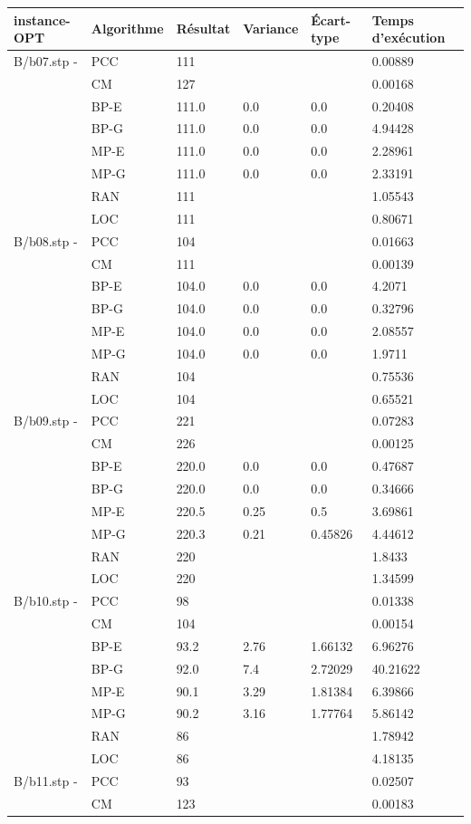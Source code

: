\documentclass[12pt,a4paper]{article}
\begin{document}
\begin{center}
	\begin{tabular}{l|l|l|l|l|l}
		instance-OPT & Algorithme & Résultat & Variance & Écart-type & Temps d'exécution\\ \hline \hline
		B/b07.stp - &PCC&111&&&0.00889\\
		&CM&127&&&0.00168\\
		&BP-E&111.0&0.0&0.0&0.20408\\
		&BP-G&111.0&0.0&0.0&4.94428\\
		&MP-E&111.0&0.0&0.0&2.28961\\
		&MP-G&111.0&0.0&0.0&2.33191\\
		&RAN&111&&&1.05543\\
		&LOC&111&&&0.80671\\\hline
		B/b08.stp - &PCC&104&&&0.01663\\
		&CM&111&&&0.00139\\
		&BP-E&104.0&0.0&0.0&4.2071\\
		&BP-G&104.0&0.0&0.0&0.32796\\
		&MP-E&104.0&0.0&0.0&2.08557\\
		&MP-G&104.0&0.0&0.0&1.9711\\
		&RAN&104&&&0.75536\\
		&LOC&104&&&0.65521\\\hline
		B/b09.stp - &PCC&221&&&0.07283\\
		&CM&226&&&0.00125\\
		&BP-E&220.0&0.0&0.0&0.47687\\
		&BP-G&220.0&0.0&0.0&0.34666\\
		&MP-E&220.5&0.25&0.5&3.69861\\
		&MP-G&220.3&0.21&0.45826&4.44612\\
		&RAN&220&&&1.8433\\
		&LOC&220&&&1.34599\\\hline
		B/b10.stp - &PCC&98&&&0.01338\\
		&CM&104&&&0.00154\\
		&BP-E&93.2&2.76&1.66132&6.96276\\
		&BP-G&92.0&7.4&2.72029&40.21622\\
		&MP-E&90.1&3.29&1.81384&6.39866\\
		&MP-G&90.2&3.16&1.77764&5.86142\\
		&RAN&86&&&1.78942\\
		&LOC&86&&&4.18135\\\hline
		B/b11.stp - &PCC&93&&&0.02507\\
		&CM&123&&&0.00183\\

\end{tabular}
\end{center}
\end{document}
